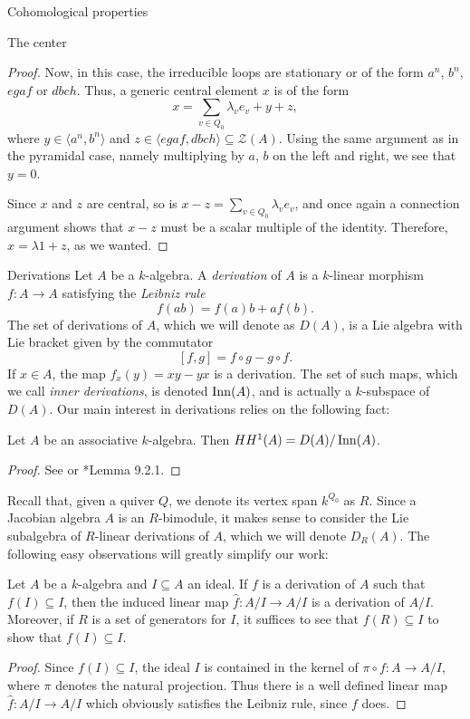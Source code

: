\begin{chapter}{Cohomological properties}
\begin{section}{The center}
\begin{proof}
Now, in this case, the irreducible loops are stationary or of the form $a^n$, $b^n$, $egaf$ or $dbch$. Thus, a generic central element $x$ is of the form
\[x = \sum_{v\in Q_0} \lambda_v e_v + y + z,\]
where $y\in\langle a^n, b^n\rangle$ and $z\in\langle egaf, dbch\rangle\subseteq \mathcal{Z}(A)$. Using the same argument as in the pyramidal case, namely multiplying by $a$, $b$ on the left and right, we see that $y=0$.

Since $x$ and $z$ are central, so is $x-z= \sum_{v\in Q_0} \lambda_v e_v$, and once again a connection argument shows that $x-z$ must be a scalar multiple of the identity. Therefore, $x=\lambda 1 + z$, as we wanted.
\end{proof}
\end{section}

\begin{section}{Derivations}
Let $A$ be a $k$-algebra. A \emph{derivation} of $A$ is a $k$-linear morphism $f:A\to A$ satisfying the \emph{Leibniz rule}
\[f(ab)=f(a)b+af(b).\]
The set of derivations of $A$, which we will denote as $D(A)$, is a Lie algebra with Lie bracket given by the commutator
\[[f,g] = f\circ g - g\circ f.\]
If $x\in A$, the map $f_x(y) = xy-yx$ is a derivation. The set of such maps, which we call \emph{inner derivations}, is denoted $\operatorname{Inn}(A)$, and is actually a $k$-subspace of $D(A)$. Our main interest in derivations relies on the following fact:

\begin{lemma} Let $A$ be an associative $k$-algebra. Then $HH^1(A) = D(A)/\operatorname{Inn}(A)$.
\end{lemma}
\begin{proof} See \cite{Red01} or \cite{Wei94}*{Lemma 9.2.1}.
\end{proof}

Recall that, given a quiver $Q$, we denote its vertex span $k^{Q_0}$ as $R$. Since a Jacobian algebra $A$ is an $R$-bimodule, it makes sense to consider the Lie subalgebra of $R$-linear derivations of $A$, which we will denote $D_R(A)$. The following easy observations will greatly simplify our work:
\begin{obs}\label{derivation-quotient} Let $A$ be a $k$-algebra and $I\subseteq A$ an ideal. If $f$ is a derivation of $A$ such that $f(I)\subseteq I$, then the induced linear map $\hat{f}:A/I\to A/I$ is a derivation of $A/I$. Moreover, if $R$ is a set of generators for $I$, it suffices to see that $f(R)\subseteq I$ to show that $f(I)\subseteq I$.
\end{obs}
\begin{proof} Since $f(I)\subseteq I$, the ideal $I$ is contained in the kernel of $\pi\circ f:A\to A/I$, where $\pi$ denotes the natural projection. Thus there is a well defined linear map $\hat{f}:A/I\to A/I$ which obviously satisfies the Leibniz rule, since $f$ does.


\end{proof}
\end{section}
\end{chapter}

